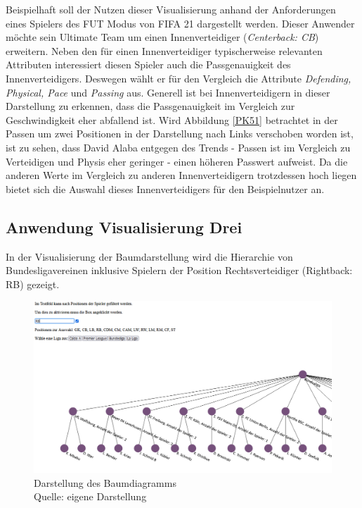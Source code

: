 \documentclass[usegeometry=true]{scrartcl}
\begin{document}
Beispielhaft soll der Nutzen dieser Visualisierung anhand der Anforderungen eines Spielers des FUT Modus von FIFA 21 dargestellt werden.
Dieser Anwender möchte sein Ultimate Team um einen Innenverteidiger (\textit{Centerback: CB}) erweitern. Neben den für einen Innenverteidiger typischerweise relevanten Attributen interessiert diesen Spieler auch die Passgenauigkeit des Innenverteidigers. Deswegen wählt er für den Vergleich die Attribute \textit{Defending, Physical, Pace} und \textit{Passing} aus. Generell ist bei Innenverteidigern in dieser Darstellung zu erkennen, dass die Passgenauigkeit im Vergleich zur Geschwindigkeit eher abfallend ist. Wird Abbildung \ref{PK51} betrachtet in der Passen um zwei Positionen in der Darstellung nach Links verschoben worden ist, ist  zu sehen, dass David Alaba entgegen des Trends - Passen ist im Vergleich zu Verteidigen und Physis eher geringer - einen höheren Passwert aufweist. Da die anderen Werte im Vergleich zu anderen Innenverteidigern trotzdessen hoch liegen bietet sich die Auswahl dieses Innenverteidigers für den Beispielnutzer an.

\subsection{Anwendung Visualisierung Drei}
In der Visualisierung der Baumdarstellung wird die Hierarchie von Bundesligavereinen inklusive Spielern der Position Rechtsverteidiger (Rightback: RB) gezeigt.
\begin{figure}[h!]
\centering
\includegraphics[scale=0.6]{grafiken/Baumdiagramm5}
\caption{Darstellung des Baumdiagramms\\ Quelle: eigene Darstellung}
\label{BD5}
\end{figure}
\end{document}
